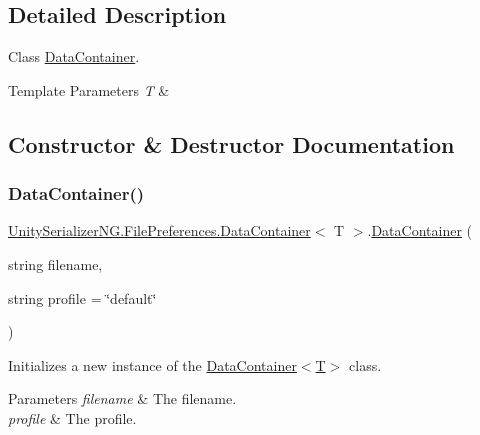\subsection{Detailed Description}
Class \hyperlink{class_unity_serializer_n_g_1_1_file_preferences_1_1_data_container}{Data\+Container}. 


\begin{DoxyTemplParams}{Template Parameters}
{\em T} & \\
\hline
\end{DoxyTemplParams}


\subsection{Constructor \& Destructor Documentation}
\mbox{\label{class_unity_serializer_n_g_1_1_file_preferences_1_1_data_container_a4b1f0577fa6ca4c776f3686345c60b54}} 
\subsubsection{\texorpdfstring{Data\+Container()}{DataContainer()}}
{\footnotesize\ttfamily \hyperlink{class_unity_serializer_n_g_1_1_file_preferences_1_1_data_container}{Unity\+Serializer\+N\+G.\+File\+Preferences.\+Data\+Container}$<$ T $>$.\hyperlink{class_unity_serializer_n_g_1_1_file_preferences_1_1_data_container}{Data\+Container} (\begin{DoxyParamCaption}\item[{string}]{filename,  }\item[{string}]{profile = {\ttfamily \char`\"{}default\char`\"{}} }\end{DoxyParamCaption})\hspace{0.3cm}{\ttfamily [inline]}}



Initializes a new instance of the \hyperlink{class_unity_serializer_n_g_1_1_file_preferences_1_1_data_container_a4b1f0577fa6ca4c776f3686345c60b54}{Data\+Container$<$\+T$>$} class. 


\begin{DoxyParams}{Parameters}
{\em filename} & The filename.\\
\hline
{\em profile} & The profile.\\
\hline
\end{DoxyParams}


